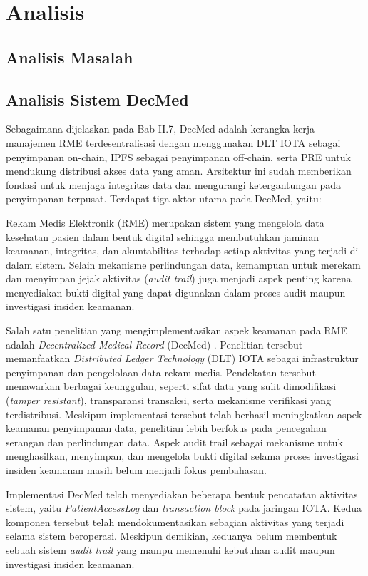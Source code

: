 \section{Analisis}

\subsection{Analisis Masalah}

\subsection{Analisis Sistem DecMed}

Sebagaimana dijelaskan pada Bab II.7, DecMed adalah kerangka kerja manajemen RME terdesentralisasi dengan menggunakan DLT IOTA sebagai penyimpanan on-chain, IPFS sebagai penyimpanan off-chain, serta PRE untuk mendukung
distribusi akses data yang aman. Arsitektur ini sudah memberikan fondasi untuk menjaga integritas data dan mengurangi ketergantungan pada penyimpanan terpusat. Terdapat tiga aktor utama pada DecMed, yaitu:

Rekam Medis Elektronik (RME) merupakan sistem yang mengelola data kesehatan pasien dalam bentuk digital sehingga membutuhkan jaminan keamanan, integritas, dan akuntabilitas terhadap setiap aktivitas yang terjadi di dalam sistem. Selain mekanisme perlindungan data, kemampuan untuk merekam dan menyimpan jejak aktivitas (\textit{audit trail}) juga menjadi aspek penting karena menyediakan bukti digital yang dapat digunakan dalam proses audit maupun investigasi insiden keamanan.

Salah satu penelitian yang mengimplementasikan aspek keamanan pada RME adalah \textit{Decentralized Medical Record} (DecMed) \cite{DecMed}. Penelitian tersebut memanfaatkan \textit{Distributed Ledger Technology} (DLT) IOTA sebagai infrastruktur penyimpanan dan pengelolaan data rekam medis. Pendekatan tersebut menawarkan berbagai keunggulan, seperti sifat data yang sulit dimodifikasi (\textit{tamper resistant}), transparansi transaksi, serta mekanisme verifikasi yang terdistribusi. Meskipun implementasi tersebut telah berhasil meningkatkan aspek keamanan penyimpanan data, penelitian lebih berfokus pada pencegahan serangan dan perlindungan data. Aspek audit trail sebagai mekanisme untuk menghasilkan, menyimpan, dan mengelola bukti digital selama proses investigasi insiden keamanan masih belum menjadi fokus pembahasan.

Implementasi DecMed telah menyediakan beberapa bentuk pencatatan aktivitas sistem, yaitu \textit{PatientAccessLog} dan \textit{transaction block} pada jaringan IOTA. Kedua komponen tersebut telah mendokumentasikan sebagian aktivitas yang terjadi selama sistem beroperasi. Meskipun demikian, keduanya belum membentuk sebuah sistem \textit{audit trail} yang mampu memenuhi kebutuhan audit maupun investigasi insiden keamanan.

